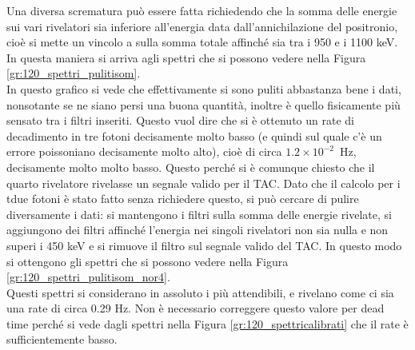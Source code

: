 Una diversa scrematura può essere fatta richiedendo che la somma delle energie sui vari rivelatori sia inferiore all'energia data dall'annichilazione del positronio, cioè si
mette un vincolo a sulla somma totale affinché sia tra i 950 e i 1100 keV. In questa maniera si arriva agli spettri che si possono vedere nella 
Figura \ref{gr:120_spettri_pulitisom}.\\


In questo grafico si vede che effettivamente si sono puliti abbastanza bene i dati, nonsotante se ne siano persi una buona quantità, inoltre è quello fisicamente più
sensato tra i filtri inseriti. Questo vuol dire che si è ottenuto un rate di decadimento in tre fotoni decisamente molto basso (e quindi sul quale c'è un errore poissoniano
decisamente molto alto), cioè di circa $1.2 \times 10^{-2}$~Hz, decisamente molto molto basso. Questo perché si è comunque chiesto che il quarto rivelatore rivelasse un
segnale valido per il TAC. Dato che il calcolo per i tdue fotoni è stato fatto senza richiedere questo, si può cercare di pulire diversamente i dati: si mantengono i filtri
sulla somma delle energie rivelate, si aggiungono dei filtri affinché l'energia nei singoli rivelatori non sia nulla e non superi i 450 keV e si rimuove il filtro sul
segnale valido del TAC. In questo modo si ottengono gli spettri che si possono vedere nella Figura \ref{gr:120_spettri_pulitisom_nor4}.\\


Questi spettri si considerano in assoluto i più attendibili, e rivelano come ci sia una rate di circa 0.29 Hz. Non è necessario correggere questo valore per dead time perché
si vede dagli spettri nella Figura \ref{gr:120_spettricalibrati} che il rate è sufficientemente basso.

\FloatBarrier
